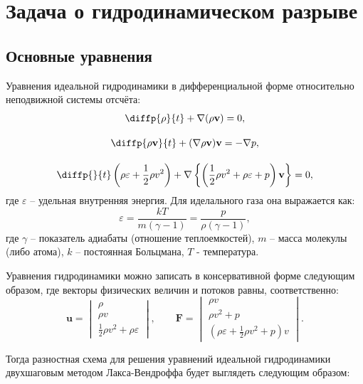 \documentclass[a4paper]{article}
\begin{document}
	\section{Задача о гидродинамическом разрыве}\label{hydrodynamics}
	\subsection{Основные уравнения}
	Уравнения идеальной гидродинамики в дифференциальной форме относительно неподвижной системы отсчёта:
	\begin{gather}\label{eqHydro}
		\diffp{\rho}{t} + \nabla ( \rho \mathbf{v} ) = 0 ,	\\[10pt]
		\diffp{\rho \mathbf{v}}{t} + (\nabla \rho \mathbf{v}) \mathbf{v} = -\nabla p ,	\\[10pt]
		\diffp{}{t}\left(\rho \varepsilon + \frac{1}{2} \rho v^2 \right) + 
						\nabla \left\{ \left( \frac{1}{2} \rho v^2 + \rho \varepsilon + p \right)\mathbf{v}\right\} = 0 ,
	\end{gather}
	где $\varepsilon$ -- удельная внутренняя энергия. Для иделального газа она выражается как:
	\begin{equation}
		\varepsilon = \dfrac{kT}{m(\gamma-1)} = \dfrac{p}{\rho (\gamma - 1)} ,
	\end{equation}
	где $\gamma$ -- показатель адиабаты (отношение теплоемкостей), $m$ -- масса молекулы (либо атома), $k$ -- постоянная Больцмана, $T$ - температура. 

	Уравнения гидродинамики можно записать в консервативной форме следующим образом,	
	где векторы физических величин и потоков равны, соответственно:
	\begin{equation}
	\mathbf{u}	=	\begin{vmatrix}
						\rho								\\
						\rho v								\\
						\frac{1}{2}\rho v^2 + \rho \varepsilon		
					\end{vmatrix} , \qquad	
	\mathbf{F}	=	\begin{vmatrix}
						\rho v								\\
						\rho v^2 + p								\\
						\left(\rho \varepsilon + \frac{1}{2}\rho v^2 + p\right)v	
	\end{vmatrix}	.		
	\end{equation}
	
	Тогда разностная схема для решения уравнений идеальной гидродинамики двухшаговым методом Лакса-Вендроффа будет выглядеть следующим образом:
	
\end{document}
